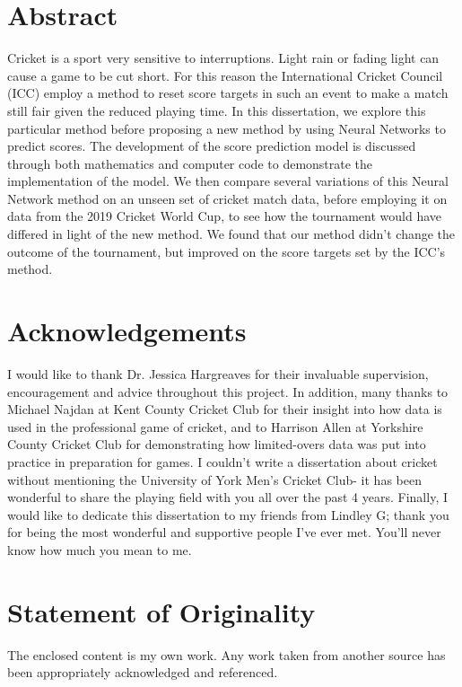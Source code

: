 \documentclass[11pt]{report}
\begin{document}


\section*{Abstract}
Cricket is a sport very sensitive to interruptions. Light rain or fading light can cause a game to be cut short. For this reason 
the International Cricket Council (ICC) employ a method to reset score targets in such an event to make a match still fair given the reduced playing time. In this dissertation, we explore this particular method 
before proposing a new method by using Neural Networks to predict scores. The development of the score prediction model is discussed through 
both mathematics and computer code to demonstrate the implementation of the model. We then compare several variations of this Neural Network method 
on an unseen set of cricket match data, before employing it on data from the 2019 Cricket World Cup, to see how the tournament would have differed in 
light of the new method. We found that our method didn't change the outcome of the tournament, but improved on the score targets set by the ICC's method.

\section*{Acknowledgements}
I would like to thank Dr. Jessica Hargreaves for their invaluable supervision, encouragement and advice throughout this project. In addition,
many thanks to Michael Najdan at Kent County Cricket Club for their insight into how data is used in the professional game of cricket, and to Harrison Allen at Yorkshire County Cricket Club for demonstrating how limited-overs data was put into practice in preparation for games. 
I couldn't write a dissertation about cricket without mentioning the University of York Men's Cricket Club- it has been wonderful to share the playing field with you all over the past 4 years.
Finally, I would like to dedicate this dissertation to my friends from Lindley G; thank you for being the most wonderful and supportive people I've ever met. You'll never know how much you mean to me.

\section*{Statement of Originality}
The enclosed content is my own work. Any work taken from another source has been appropriately acknowledged and referenced. 
\end{document}
